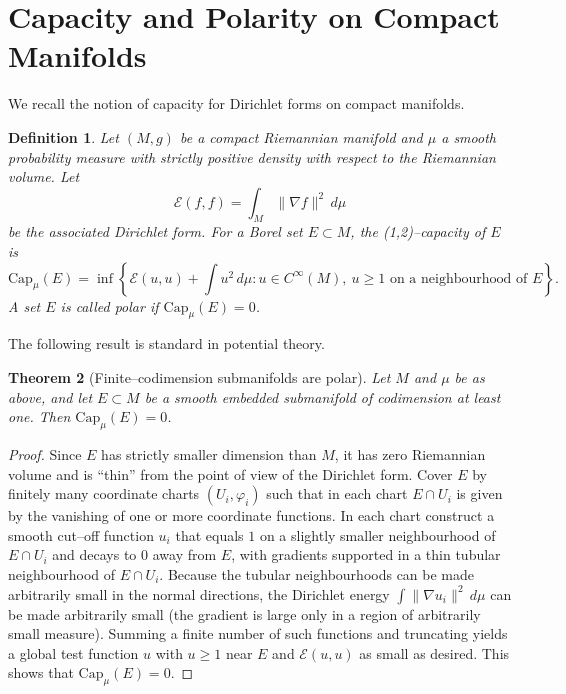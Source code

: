 \documentclass[11pt]{article}
\newtheorem{theorem}{Theorem}[section]
\newtheorem{definition}[theorem]{Definition}
\begin{document}
\section{Capacity and Polarity on Compact Manifolds}

We recall the notion of capacity for Dirichlet forms on compact
manifolds.

\begin{definition}
Let $(M,g)$ be a compact Riemannian manifold and $\mu$ a smooth
probability measure with strictly positive density with respect to the
Riemannian volume.  Let
\[
  \mathcal{E}(f,f) = \int_M \|\nabla f\|^2\,d\mu
\]
be the associated Dirichlet form.  For a Borel set $E\subset M$, the
(1,2)--capacity of $E$ is
\begin{equation}
  \mathrm{Cap}_\mu(E)
  = \inf\left\{ \mathcal{E}(u,u) + \int u^2\,d\mu :
    u\in C^\infty(M),\ u\ge 1 \text{ on a neighbourhood of }E\right\}.
\end{equation}
A set $E$ is called \emph{polar} if $\mathrm{Cap}_\mu(E)=0$.
\end{definition}

The following result is standard in potential theory.

\begin{theorem}[Finite--codimension submanifolds are polar]
\label{thm:submanifold-polar}
Let $M$ and $\mu$ be as above, and let $E\subset M$ be a smooth embedded
submanifold of codimension at least one.  Then $\mathrm{Cap}_\mu(E)=0$.
\end{theorem}

\begin{proof}
Since $E$ has strictly smaller dimension than $M$, it has zero
Riemannian volume and is ``thin'' from the point of view of the Dirichlet
form.  Cover $E$ by finitely many coordinate charts $(U_i,\varphi_i)$
such that in each chart $E\cap U_i$ is given by the vanishing of one or
more coordinate functions.  In each chart construct a smooth cut--off
function $u_i$ that equals $1$ on a slightly smaller neighbourhood of
$E\cap U_i$ and decays to $0$ away from $E$, with gradients supported in
a thin tubular neighbourhood of $E\cap U_i$.  Because the tubular
neighbourhoods can be made arbitrarily small in the normal directions,
the Dirichlet energy $\int\|\nabla u_i\|^2\,d\mu$ can be made
arbitrarily small (the gradient is large only in a region of arbitrarily
small measure).  Summing a finite number of such functions and
truncating yields a global test function $u$ with $u\ge 1$ near $E$ and
$\mathcal{E}(u,u)$ as small as desired.  This shows that
$\mathrm{Cap}_\mu(E)=0$.
\end{proof}
\end{document}
